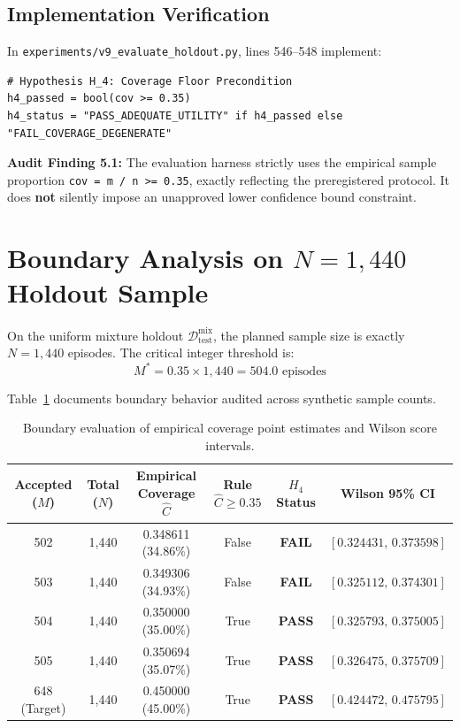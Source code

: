 \documentclass[10pt,a4paper]{article}
\begin{document}
\subsection{Implementation Verification}
In \texttt{experiments/v9\_evaluate\_holdout.py}, lines 546--548 implement:
\begin{verbatim}
# Hypothesis H_4: Coverage Floor Precondition
h4_passed = bool(cov >= 0.35)
h4_status = "PASS_ADEQUATE_UTILITY" if h4_passed else "FAIL_COVERAGE_DEGENERATE"
\end{verbatim}
\textbf{Audit Finding 5.1:}  
The evaluation harness strictly uses the empirical sample proportion \texttt{cov = m / n >= 0.35}, exactly reflecting the preregistered protocol. It does \textbf{not} silently impose an unapproved lower confidence bound constraint.

\section{Boundary Analysis on $N = 1,440$ Holdout Sample}
On the uniform mixture holdout $\mathcal{D}_{\mathrm{test}}^{\mathrm{mix}}$, the planned sample size is exactly $N = 1,440$ episodes. The critical integer threshold is:
\begin{equation}
M^* = 0.35 \times 1,440 = 504.0 \text{ episodes}
\end{equation}

Table~\ref{tab:coverage_boundary} documents boundary behavior audited across synthetic sample counts.

\begin{table}[h!]
\centering
\small
\begin{tabularx}{\textwidth}{cccccc}
\toprule
\textbf{Accepted} ($M$) & \textbf{Total} ($N$) & \textbf{Empirical Coverage} $\hat{C}$ & \textbf{Rule} $\hat{C} \ge 0.35$ & $H_4$ \textbf{Status} & \textbf{Wilson 95\% CI} \\
\midrule
502 & 1,440 & 0.348611 (34.86\%) & False & \textbf{FAIL} & $[0.324431, \, 0.373598]$ \\
503 & 1,440 & 0.349306 (34.93\%) & False & \textbf{FAIL} & $[0.325112, \, 0.374301]$ \\
504 & 1,440 & 0.350000 (35.00\%) & True & \textbf{PASS} & $[0.325793, \, 0.375005]$ \\
505 & 1,440 & 0.350694 (35.07\%) & True & \textbf{PASS} & $[0.326475, \, 0.375709]$ \\
648 (Target) & 1,440 & 0.450000 (45.00\%) & True & \textbf{PASS} & $[0.424472, \, 0.475795]$ \\
\bottomrule
\end{tabularx}
\caption{Boundary evaluation of empirical coverage point estimates and Wilson score intervals.}
\label{tab:coverage_boundary}
\end{table}
\end{document}
